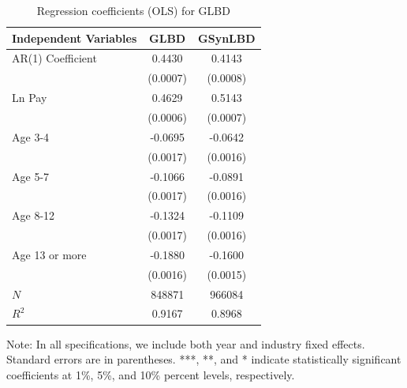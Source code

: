 \documentclass[10pt,twoside]{article}
\newcommand{\sym}[1]{\rlap{#1}}
\begin{document}
\begin{table}[H]
  \centering
\caption{Regression coefficients (OLS) for GLBD} \label{tab:OLS_ger} \medskip
\renewcommand{\arraystretch}{1}
\setlength{\tabcolsep}{14pt}
\begin{tabular}{l|c |c}
\toprule
\textbf{Independent Variables}&\textbf{GLBD} &  \textbf{GSynLBD}\\
\midrule

AR(1) Coefficient&   0.4430\sym{***}&   0.4143\sym{***}\\
          & (0.0007)         & (0.0008)         \\
[1em]
Ln Pay    &   0.4629\sym{***}&   0.5143\sym{***}\\
          & (0.0006)         & (0.0007)         \\
[1em]
Age 3-4   &  -0.0695\sym{***}&  -0.0642\sym{***}\\
          & (0.0017)         & (0.0016)         \\
[1em]
Age 5-7   &  -0.1066\sym{***}&  -0.0891\sym{***}\\
          & (0.0017)         & (0.0016)         \\
[1em]
Age 8-12  &  -0.1324\sym{***}&  -0.1109\sym{***}\\
          & (0.0017)         & (0.0016)         \\
[1em]
Age 13 or more&  -0.1880\sym{***}&  -0.1600\sym{***}\\
          & (0.0016)         & (0.0015)         \\
\midrule
\(N\)     &   848871         &   966084         \\
\(R^{2}\) &   0.9167         &   0.8968         \\
    \bottomrule
  \end{tabular} 
\begin{tablenotes}
\small
\item Note: In all specifications, we include both year and industry fixed effects. Standard errors are in parentheses.  ***, **, and * indicate statistically significant coefficients at 1\%, 5\%, and 10\% percent levels, respectively.
 \end{tablenotes}
\end{table}
\end{document}
